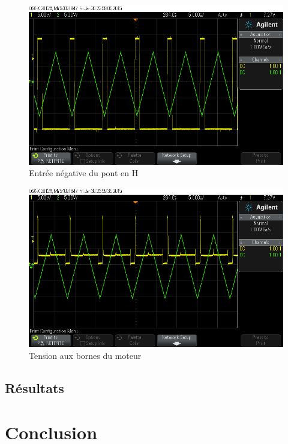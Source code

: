 \documentclass[a4paper]{article}
\begin{document}
\begin{figure}[h!]
  \centering
    \includegraphics[width=1\textwidth]{scope_2}
  \caption{Entrée négative du pont en H}
\end{figure}

\begin{figure}[h!]
  \centering
    \includegraphics[width=1\textwidth]{scope_3}
  \caption{Tension aux bornes du moteur}
\end{figure}

\subsection{Résultats}

\section{Conclusion}
\end{document}
